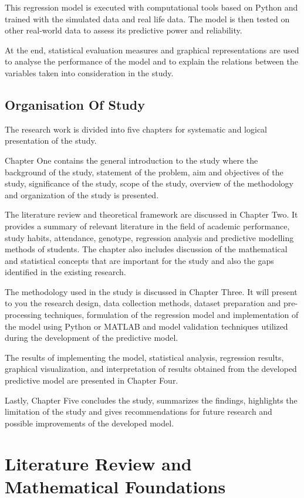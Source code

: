 \documentclass[12pt]{report}
\begin{document}
	This regression model is executed with computational tools based on Python and trained with the simulated data and real life data. The model is then tested on other real-world data to assess its predictive power and reliability.
	
	At the end, statistical evaluation measures and graphical representations are used to analyse the performance of the model and to explain the relations between the variables taken into consideration in the study.
	
	\section{Organisation Of Study}
	The research work is divided into five chapters for systematic and logical presentation of the study.
	
	Chapter One contains the general introduction to the study where the background of the study, statement of the problem, aim and objectives of the study, significance of the study, scope of the study, overview of the methodology and organization of the study is presented.
	
	The literature review and theoretical framework are discussed in Chapter Two. It provides a summary of relevant literature in the field of academic performance, study habits, attendance, genotype, regression analysis and predictive modelling methods of students. The chapter also includes discussion of the mathematical and statistical concepts that are important for the study and also the gaps identified in the existing research.
	
	The methodology used in the study is discussed in Chapter Three. It will present to you the research design, data collection methods, dataset preparation and pre-processing techniques, formulation of the regression model and implementation of the model using Python or MATLAB and model validation techniques utilized during the development of the predictive model.
	
	The results of implementing the model, statistical analysis, regression results, graphical visualization, and interpretation of results obtained from the developed predictive model are presented in Chapter Four.
	
	Lastly, Chapter Five concludes the study, summarizes the findings, highlights the limitation of the study and gives recommendations for future research and possible improvements of the developed model.
	
	\chapter{Literature Review and Mathematical Foundations}
\end{document}
